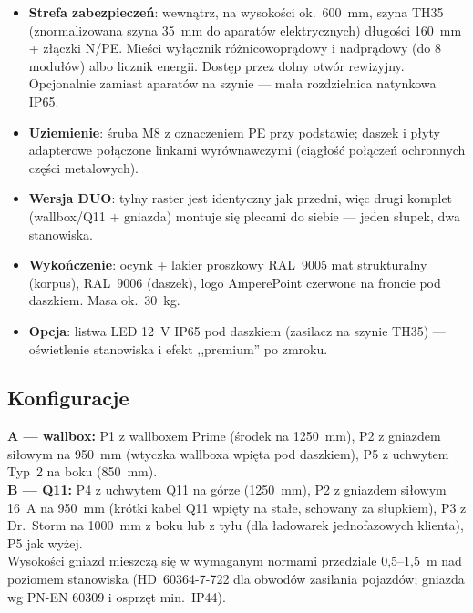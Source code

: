 \documentclass[11pt,a4paper]{article}
\begin{document}
\begin{itemize}
na zewnątrz.
\item \textbf{Strefa zabezpieczeń}: wewnątrz, na wysokości ok.~600~mm, szyna TH35 (znormalizowana
szyna 35~mm do aparatów elektrycznych) długości 160~mm + złączki N/PE. Mieści wyłącznik
różnicowoprądowy i nadprądowy (do 8 modułów) albo licznik energii. Dostęp przez dolny otwór rewizyjny.
Opcjonalnie zamiast aparatów na szynie --- mała rozdzielnica natynkowa IP65.
\item \textbf{Uziemienie}: śruba M8 z oznaczeniem PE przy podstawie; daszek i płyty adapterowe
połączone linkami wyrównawczymi (ciągłość połączeń ochronnych części metalowych).
\item \textbf{Wersja DUO}: tylny raster jest identyczny jak przedni, więc drugi komplet
(wallbox/Q11 + gniazda) montuje się plecami do siebie --- jeden słupek, dwa stanowiska.
\item \textbf{Wykończenie}: ocynk + lakier proszkowy RAL~9005 mat strukturalny (korpus), RAL~9006
(daszek), logo AmperePoint czerwone na froncie pod daszkiem. Masa ok.~30~kg.
\item \textbf{Opcja}: listwa LED 12~V IP65 pod daszkiem (zasilacz na szynie TH35) --- oświetlenie
stanowiska i efekt ,,premium'' po zmroku.
\end{itemize}

\subsection{Konfiguracje}
\textbf{A --- wallbox:} P1 z wallboxem Prime (środek na 1250~mm), P2 z gniazdem siłowym na 950~mm
(wtyczka wallboxa wpięta pod daszkiem), P5 z uchwytem Typ~2 na boku (850~mm).\\
\textbf{B --- Q11:} P4 z uchwytem Q11 na górze (1250~mm), P2 z gniazdem siłowym 16~A na 950~mm
(krótki kabel Q11 wpięty na stałe, schowany za słupkiem), P3 z Dr.~Storm na 1000~mm z boku lub
z tyłu (dla ładowarek jednofazowych klienta), P5 jak wyżej.\\
Wysokości gniazd mieszczą się w wymaganym normami przedziale 0{,}5--1{,}5~m nad poziomem stanowiska
(HD~60364-7-722 dla obwodów zasilania pojazdów; gniazda wg PN-EN 60309 i osprzęt min.~IP44).
\end{document}
